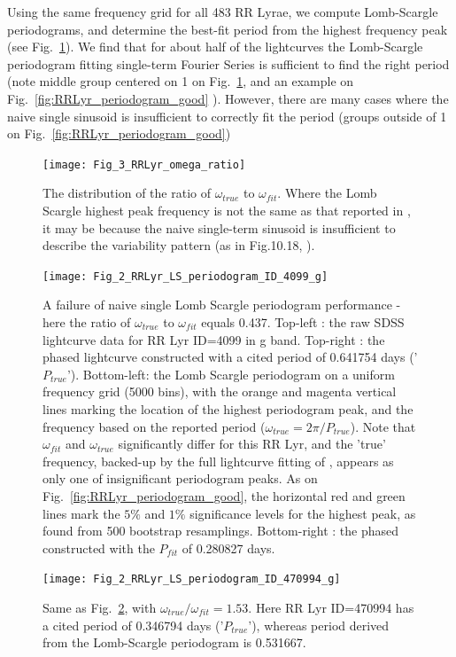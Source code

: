\documentclass[fleqn,usenatbib]{mnras} %
\begin{document}
Using the same frequency grid for all 483 RR Lyrae, we compute Lomb-Scargle periodograms, and determine the best-fit period from the highest frequency peak (see Fig.~\ref{fig:RRLyr_period_ratios}).  We find that for about half of the lightcurves the Lomb-Scargle periodogram fitting single-term Fourier Series  is sufficient to find the right period (note middle group  centered on 1 on Fig.~\ref{fig:RRLyr_period_ratios}, and an example on Fig.~\ref{fig:RRLyr_periodogram_good} ). However, there are many cases  where the naive single sinusoid is insufficient to correctly fit the period (groups outside of 1 on Fig.~\ref{fig:RRLyr_periodogram_good})


\begin{figure}
\texttt{[image: Fig\_3\_RRLyr\_omega\_ratio]}
\caption{The distribution of the ratio of $\omega_{true}$ to $\omega_{fit}$. Where the Lomb Scargle highest peak frequency is not the same as that reported in \citep{sesar2010}, it may be because the naive single-term sinusoid is insufficient to describe the variability pattern (as in Fig.10.18, \citep{ivezic2014}). }
\label{fig:RRLyr_period_ratios}
\end{figure}


\begin{figure}
\texttt{[image: Fig\_2\_RRLyr\_LS\_periodogram\_ID\_4099\_g]}
\caption{ A failure of naive single Lomb Scargle periodogram performance - here the ratio of $\omega_{true}$ to $\omega_{fit}$ equals 0.437. Top-left : the raw  SDSS lightcurve data for RR Lyr ID=4099 in g band. Top-right : the phased lightcurve constructed with a cited period of 0.641754 days ('$P_{true}$'). Bottom-left: the Lomb Scargle periodogram on  a uniform frequency grid (5000 bins), with the orange and magenta vertical lines marking the location of the highest periodogram peak, and the frequency based on the reported period ($\omega_{true} = 2 \pi / P_{true}$). Note that $\omega_{fit}$ and $\omega_{true}$ significantly differ for this RR Lyr,  and the 'true' frequency, backed-up by the full lightcurve fitting of \citep{sesar2010}, appears as only one of insignificant periodogram peaks. As on Fig.~\ref{fig:RRLyr_periodogram_good},  the horizontal red and green lines mark the $5\%$ and $1\%$  significance levels for the highest peak, as found from 500 bootstrap resamplings.  Bottom-right : the phased constructed with the $P_{fit}$ of  0.280827 days. }
\label{fig:RRLyr_periodogram_fail1}
\end{figure}
%

\begin{figure}
\texttt{[image: Fig\_2\_RRLyr\_LS\_periodogram\_ID\_470994\_g]}
\caption{Same as Fig.~\ref{fig:RRLyr_periodogram_fail1}, with $\omega_{true} / \omega_{fit} = 1.53$. Here  RR Lyr ID=470994 has a cited period of 0.346794  days ('$P_{true}$'), whereas period derived from the Lomb-Scargle periodogram is 0.531667.}
\label{fig:RRLyr_periodogram_fail2}
\end{figure}
\end{document}
